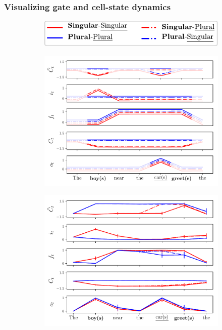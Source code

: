 \subsubsection{Visualizing gate and cell-state dynamics}\label{subsec:gate-dynamics}
\begin{figure}[ht]
    \centering
    \begin{subfigure}{\textwidth}
            \centering
            \includegraphics[width=0.3\linewidth]{Figures/legend.pdf}
    \end{subfigure}
    \bigskip
    \begin{subfigure}{0.3\textwidth}
            \centering
            \includegraphics[width=\linewidth]{Figures/unit-timeseries-cartoon.pdf}
    \label{fig:cartoon}
    \end{subfigure}
    \begin{subfigure}{0.3\textwidth}
            \centering
            \includegraphics[width=\linewidth]{Figures/nounpp_987.pdf}

\end{subfigure}
\end{figure}
